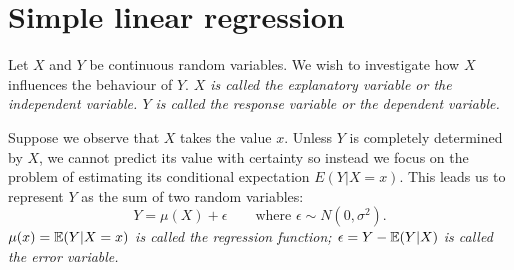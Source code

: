 
\section{Simple linear regression}\label{sec:regression}

Let $X$ and $Y$ be continuous random variables. We wish to investigate how $X$ influences the behaviour of $Y$.
\bit
\it $X$ is called the \emph{explanatory variable} or the \emph{independent variable}.
\it $Y$ is called the \emph{response variable} or the \emph{dependent variable}.
\eit

Suppose we observe that $X$ takes the value $x$. Unless $Y$ is completely determined by $X$, we cannot predict its value with certainty so instead we focus on the problem of estimating its conditional expectation $E(Y|X=x)$. This leads us to represent $Y$ as the sum of two random variables:
\[
Y = \mu(X) + \epsilon  \qquad\text{where $\epsilon\sim N(0,\sigma^2)$.}
\]
\bit
\it $\mu(x) = \mathbb{E}(Y|X=x)$ is called the \emph{regression function};
\it $\epsilon = Y - \mathbb{E}(Y|X)$ is called the \emph{error variable}.
\eit
 

